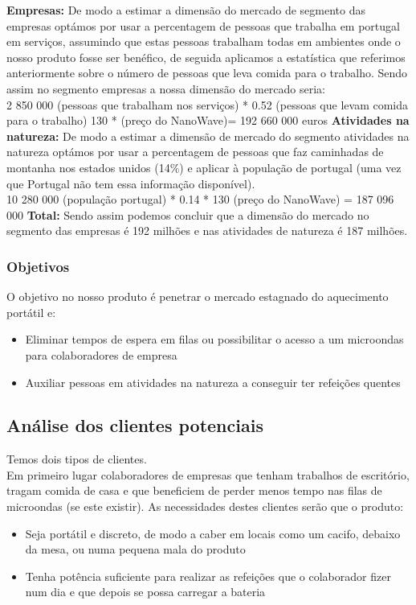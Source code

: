 \documentclass[a4paper]{article}
\begin{document}
\textbf{Empresas:} De modo a estimar a dimensão do mercado de segmento das empresas optámos por usar a percentagem de pessoas que trabalha em portugal em serviços, assumindo que estas pessoas trabalham todas em ambientes onde o nosso produto fosse ser benéfico, de seguida aplicamos a estatística que referimos anteriormente sobre o número de pessoas que leva comida para o trabalho. Sendo assim no segmento empresas a nossa dimensão do mercado seria:\\
2 850 000 (pessoas que trabalham nos serviços) * 0.52 (pessoas que levam comida para o trabalho) 130 * (preço do NanoWave)=  192 660 000 euros \linebreak\linebreak
\textbf{Atividades na natureza:} De modo a estimar a dimensão de mercado do segmento atividades na natureza optámos por usar a percentagem de pessoas que faz caminhadas de montanha nos estados unidos (14\%) e aplicar à população de portugal (uma vez que Portugal não tem essa informação disponível). \\
10 280 000 (população portugal) * 0.14 * 130 (preço do NanoWave) = 187 096 000 \linebreak\linebreak
\textbf{Total:} Sendo assim podemos concluir que a dimensão do mercado no segmento das empresas é 192 milhões e nas atividades de natureza é 187 milhões. 
\subsubsection{Objetivos}
O objetivo no nosso produto é penetrar o mercado estagnado do aquecimento portátil e:
\begin{itemize}
 \item Eliminar tempos de espera em filas ou possibilitar o acesso a um microondas para colaboradores de empresa
 \item Auxiliar pessoas em atividades na natureza a conseguir ter refeições quentes
\end{itemize}

\subsection{Análise dos clientes potenciais}
Temos dois tipos de clientes.\\
Em primeiro lugar colaboradores de empresas que tenham trabalhos de escritório, tragam comida de casa e que beneficiem de perder menos tempo nas filas de microondas (se este existir). As necessidades destes clientes serão que o produto:
\begin{itemize}
    \item Seja portátil e discreto, de modo a caber em locais como um cacifo, debaixo da mesa, ou numa pequena mala do produto
    \item Tenha potência suficiente para realizar as refeições que o colaborador fizer num dia e que depois se possa carregar a bateria
\end{itemize}
\end{document}
